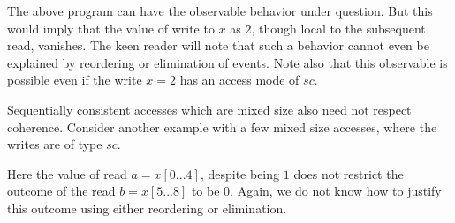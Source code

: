         The above program can have the observable behavior under question.
        But this would imply that the value of write to $x$ as $2$, though local to the subsequent read, vanishes. 
        The keen reader will note that such a behavior cannot even be explained by reordering or elimination of events.
        Note also that this observable is possible even if the write $x=2$ has an access mode of $sc$. 

        Sequentially consistent accesses which are mixed size also need not respect coherence.
        Consider another example with a few mixed size accesses, where the writes are of type $sc$.


        Here the value of read $a=x[0...4]$, despite being $1$ does not restrict the outcome of the read $b=x[5...8]$ to be $0$. 
        Again, we do not know how to justify this outcome using either reordering or elimination. 
